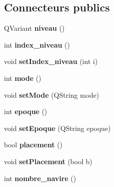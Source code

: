 \subsection*{Connecteurs publics}
\begin{DoxyCompactItemize}
\item 
Q\+Variant {\bfseries niveau} ()\hypertarget{class_launcher_a066cf8162322b8c548a5374ffd91a065}{}\label{class_launcher_a066cf8162322b8c548a5374ffd91a065}

\item 
int {\bfseries index\+\_\+niveau} ()\hypertarget{class_launcher_a615138eaf9a49eff6cecda2be7145f96}{}\label{class_launcher_a615138eaf9a49eff6cecda2be7145f96}

\item 
void {\bfseries set\+Index\+\_\+niveau} (int i)\hypertarget{class_launcher_afa0d73c92ab966138c515b40d1b4ed3d}{}\label{class_launcher_afa0d73c92ab966138c515b40d1b4ed3d}

\item 
int {\bfseries mode} ()\hypertarget{class_launcher_affbdb351a7da8ae1e9030084ed3f4fd6}{}\label{class_launcher_affbdb351a7da8ae1e9030084ed3f4fd6}

\item 
void {\bfseries set\+Mode} (Q\+String mode)\hypertarget{class_launcher_a06b9eca9d74aae8a03b46b5bde878fe4}{}\label{class_launcher_a06b9eca9d74aae8a03b46b5bde878fe4}

\item 
int {\bfseries epoque} ()\hypertarget{class_launcher_a78cf7830a87925184255033388bef731}{}\label{class_launcher_a78cf7830a87925184255033388bef731}

\item 
void {\bfseries set\+Epoque} (Q\+String epoque)\hypertarget{class_launcher_ad6df98ebd2924b167e64f9a9fedd98e2}{}\label{class_launcher_ad6df98ebd2924b167e64f9a9fedd98e2}

\item 
bool {\bfseries placement} ()\hypertarget{class_launcher_ac0837d73a6998d55be80daab8fa46c6d}{}\label{class_launcher_ac0837d73a6998d55be80daab8fa46c6d}

\item 
void {\bfseries set\+Placement} (bool b)\hypertarget{class_launcher_a4879d5ff3d4abc22cb14ce1caf46a3e5}{}\label{class_launcher_a4879d5ff3d4abc22cb14ce1caf46a3e5}

\item 
int {\bfseries nombre\+\_\+navire} ()\hypertarget{class_launcher_abc6ea53613b21dabd9d17c0264e55c74}{}\label{class_launcher_abc6ea53613b21dabd9d17c0264e55c74}


\end{DoxyCompactItemize}
